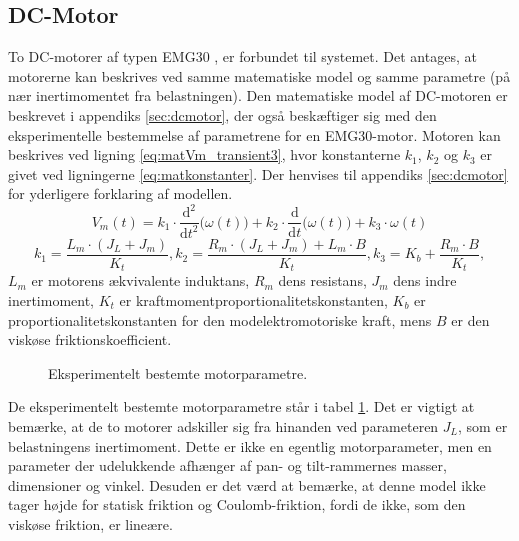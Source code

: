 \subsection{DC-Motor}
To DC-motorer af typen EMG30 \citep{emgmotor}, er forbundet til systemet.
Det antages, at motorerne kan beskrives ved samme matematiske model og samme parametre (på nær inertimomentet fra belastningen).
Den matematiske model af DC-motoren er beskrevet i appendiks \ref{sec:dcmotor},
der også beskæftiger sig med den eksperimentelle bestemmelse af parametrene for en EMG30-motor.
Motoren kan beskrives ved ligning \ref{eq:matVm_transient3}, hvor konstanterne \(k_1\), \(k_2\) og \(k_3\)
er givet ved ligningerne \ref{eq:matkonstanter}. Der henvises til appendiks \ref{sec:dcmotor}
for yderligere forklaring af modellen.
\begin{equation}
	V_m\left(t\right)=k_1\cdot{}\frac{\mathrm d^2}{\mathrm d t^2} \big(\omega\left(t\right) \big)
		+k_2\cdot{}\frac{\mathrm d}{\mathrm d t} \big(\omega\left(t\right) \big)
		+k_3\cdot{}\omega\left(t\right)
	\label{eq:matVm_transient3}
 \end{equation}
\begin{equation}
	k_1=\frac{L_m\cdot{}\left(J_L+J_m\right)}{K_t},
	k_2=\frac{R_m\cdot{}\left(J_L+J_m\right)+L_m\cdot{}B}{K_t},
	k_3=K_b+\frac{R_m\cdot{}B}{K_t},
	\label{eq:matkonstanter} 
 \end{equation}
\(L_m\) er motorens ækvivalente induktans, \(R_m\) dens resistans, \(J_m\) dens indre inertimoment,
\(K_t\) er kraftmomentproportionalitetskonstanten, \(K_b\) er proportionalitetskonstanten for den modelektromotoriske kraft,
mens \(B\) er den viskøse friktionskoefficient.
\begin{figure}[th!]
	\centering
	
	\captionsetup{type=table}
	\caption[Motorparametre]
			{Eksperimentelt bestemte motorparametre.}
	\label{tb:matmotorparametre}
\end{figure}

De eksperimentelt bestemte motorparametre står i tabel \ref{tb:matmotorparametre}.
Det er vigtigt at bemærke, at de to motorer adskiller sig fra hinanden ved parameteren \(J_L\), som er belastningens
inertimoment. Dette er ikke en egentlig motorparameter, men en parameter der udelukkende afhænger
af pan- og tilt-rammernes masser, dimensioner og vinkel.
Desuden er det værd at bemærke, at denne model ikke tager højde for statisk friktion og Coulomb-friktion,
fordi de ikke, som den viskøse friktion, er lineære. 

